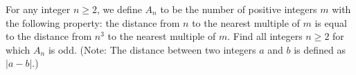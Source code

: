 For any integer $n \ge2$,  we define $ A_n$ to be the number of positive integers $ m$ with the following property: the distance from $n$ to the nearest multiple of $m$ is equal to the distance from $n^3$ to the nearest multiple of $ m$. Find all integers $n \ge 2 $ for which $ A_n$ is odd. (Note: The distance between two integers $ a$ and $b$ is defined as $|a -b|$.)